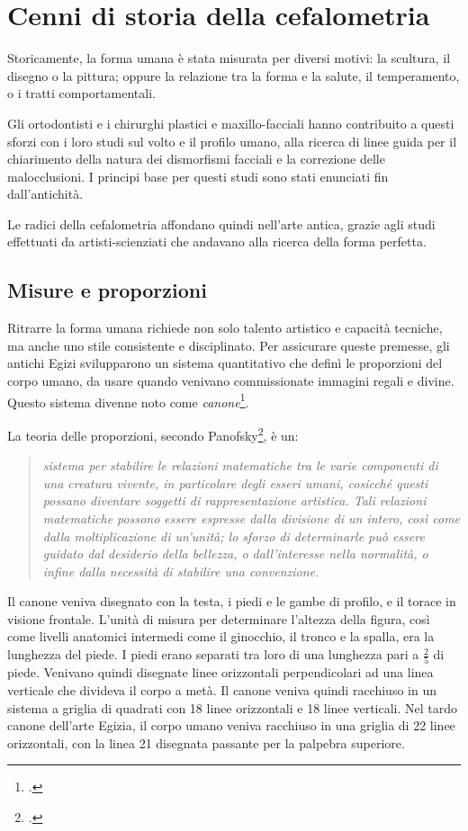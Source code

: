 \chapter{Cenni di storia della cefalometria}
Storicamente, la forma umana è stata misurata per diversi motivi: la scultura, il disegno o la pittura; oppure la relazione tra la forma e la salute, il temperamento, o i tratti comportamentali.

Gli ortodontisti e i chirurghi plastici e maxillo-facciali hanno contribuito a questi sforzi con i loro studi sul volto e il profilo umano, alla ricerca di linee guida per il chiarimento della natura dei dismorfismi facciali e la correzione delle malocclusioni. I principi base per questi studi sono stati enunciati fin dall'antichità.

Le radici della cefalometria affondano quindi nell'arte antica, grazie agli studi effettuati da artisti-scienziati che andavano alla ricerca della forma perfetta.

\section{Misure e proporzioni}
Ritrarre la forma umana richiede non solo talento artistico e capacità tecniche, ma anche uno stile consistente e disciplinato. Per assicurare queste premesse, gli antichi Egizi svilupparono un sistema quantitativo che definì le proporzioni del corpo umano, da usare quando venivano commissionate immagini regali e divine. Questo sistema divenne noto come \textit{canone}\footcite{Schaefer1963,Mueller1973,Iversen1975}.

La teoria delle proporzioni, secondo Panofsky\footcite{Panofsky1974}, è un:
\begin{quotation}
\textit{sistema per stabilire le relazioni matematiche tra le varie componenti di una creatura vivente, in particolare degli esseri umani, cosicché questi possano diventare soggetti di rappresentazione artistica. Tali relazioni matematiche possono essere espresse dalla divisione di un intero, così come dalla moltiplicazione di un'unità; lo sforzo di determinarle può essere guidato dal desiderio della bellezza, o dall'interesse nella normalità, o infine dalla necessità di stabilire una convenzione.}
\end{quotation}

Il canone veniva disegnato con la testa, i piedi e le gambe di profilo, e il torace in visione frontale. L'unità di misura per determinare l'altezza della figura, così come livelli anatomici intermedi come il ginocchio, il tronco e la spalla, era la lunghezza del piede. I piedi erano separati tra loro di una lunghezza pari a $\frac{2}{5}$ di piede. Venivano quindi disegnate linee orizzontali perpendicolari ad una linea verticale che divideva il corpo a metà. Il canone veniva quindi racchiuso in un sistema a griglia di quadrati con 18 linee orizzontali e 18 linee verticali. Nel tardo canone dell'arte Egizia, il corpo umano veniva racchiuso in una griglia di 22 linee orizzontali, con la linea 21 disegnata passante per la palpebra superiore.

